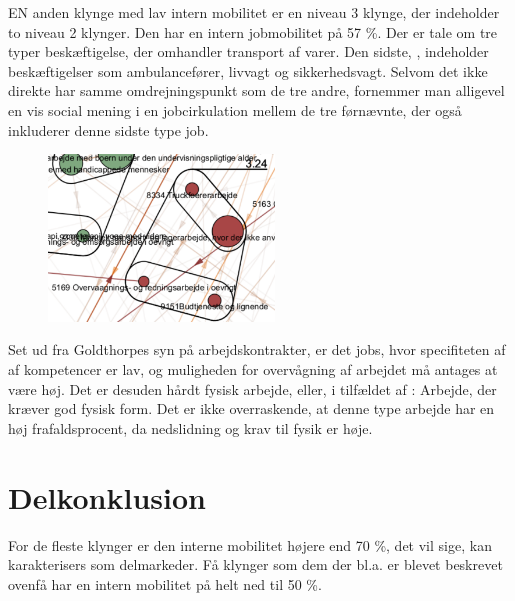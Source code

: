 EN anden klynge  med lav intern mobilitet er en niveau 3 klynge, der indeholder to niveau 2 klynger. Den har en intern jobmobilitet på 57 \%. Der er tale om tre typer beskæftigelse, der omhandler transport af varer. Den sidste, , indeholder beskæftigelser som ambulancefører, livvagt og sikkerhedsvagt. Selvom det ikke direkte har samme omdrejningspunkt som de tre andre, fornemmer man alligevel en vis social mening i en jobcirkulation mellem de tre førnævnte, der også inkluderer denne sidste type job. 

%
\begin{figure}
  \vspace{-20pt}
  \begin{center}
    \includegraphics[width=6cm]{fig/segzoom/seg_3_24.pdf}
   \caption{}
   \label{fig_delanalyse1_zoom_3_24}
  \end{center}
  \vspace{-20pt}
\end{figure}
%

Set ud fra Goldthorpes syn på arbejdskontrakter, er det jobs, hvor specifiteten af af kompetencer er lav, og muligheden for overvågning af arbejdet må antages at være høj. Det er desuden hårdt fysisk arbejde, eller, i  tilfældet af : Arbejde, der kræver god fysisk form. Det er ikke overraskende, at denne type arbejde har en høj frafaldsprocent, da nedslidning og krav til fysik er høje. %



\section{Delkonklusion \label{}}
For de fleste klynger er den interne mobilitet højere end 70 \%, det vil sige, kan karakterisers som delmarkeder. Få klynger som dem der bl.a. er blevet beskrevet ovenfå har en intern mobilitet på helt ned til 50 \%. 


